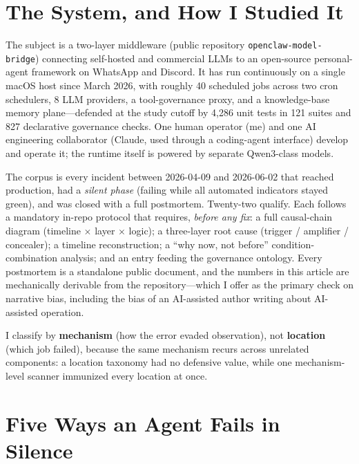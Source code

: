 \documentclass[10pt,journal]{IEEEtran}
\newcommand{\sysname}{\texttt{openclaw-model-bridge}}
\begin{document}
\section{The System, and How I Studied It}
The subject is a two-layer middleware (public repository \sysname) connecting
self-hosted and commercial LLMs to an open-source personal-agent framework on
WhatsApp and Discord. It has run continuously on a single macOS host since
March 2026, with roughly 40 scheduled jobs across two cron schedulers, 8 LLM
providers, a tool-governance proxy, and a knowledge-base memory
plane---defended at the study cutoff by 4{,}286 unit tests in 121 suites and
827 declarative governance checks. One human operator (me) and one AI
engineering collaborator (Claude, used through a coding-agent interface)
develop and operate it; the runtime itself is powered by separate Qwen3-class
models.

The corpus is every incident between 2026-04-09 and 2026-06-02 that reached
production, had a \emph{silent phase} (failing while all automated indicators
stayed green), and was closed with a full postmortem. Twenty-two qualify. Each
follows a mandatory in-repo protocol that requires, \emph{before any fix}: a
full causal-chain diagram (timeline $\times$ layer $\times$ logic); a
three-layer root cause (trigger / amplifier / concealer); a timeline
reconstruction; a ``why now, not before'' condition-combination analysis; and
an entry feeding the governance ontology. Every postmortem is a standalone
public document, and the numbers in this article are mechanically derivable
from the repository---which I offer as the primary check on narrative bias,
including the bias of an AI-assisted author writing about AI-assisted
operation.

I classify by \textbf{mechanism} (how the error evaded observation), not
\textbf{location} (which job failed), because the same mechanism recurs across
unrelated components: a location taxonomy had no defensive value, while one
mechanism-level scanner immunized every location at once.

\section{Five Ways an Agent Fails in Silence}
\end{document}
